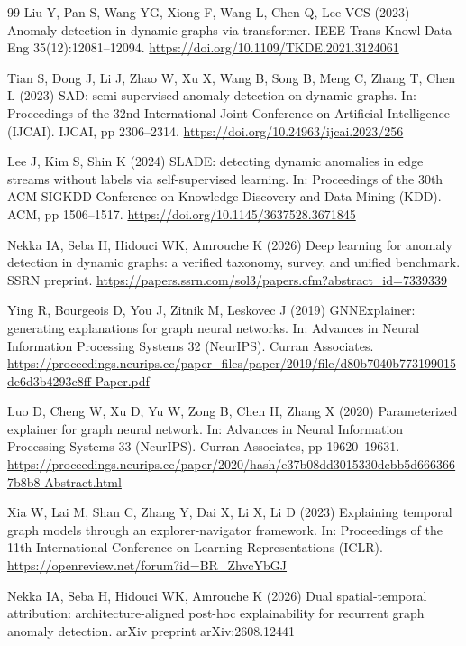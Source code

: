 \documentclass[pdflatex,sn-basic]{sn-jnl}
\theoremstyle{definition}
\theoremstyle{plain}
\begin{document}
\begin{thebibliography}{99}
Liu Y, Pan S, Wang YG, Xiong F, Wang L, Chen Q, Lee VCS (2023) Anomaly detection in dynamic graphs via transformer. IEEE Trans Knowl Data Eng 35(12):12081--12094. \url{https://doi.org/10.1109/TKDE.2021.3124061}

Tian S, Dong J, Li J, Zhao W, Xu X, Wang B, Song B, Meng C, Zhang T, Chen L (2023) SAD: semi-supervised anomaly detection on dynamic graphs. In: Proceedings of the 32nd International Joint Conference on Artificial Intelligence (IJCAI). IJCAI, pp 2306--2314. \url{https://doi.org/10.24963/ijcai.2023/256}

Lee J, Kim S, Shin K (2024) SLADE: detecting dynamic anomalies in edge streams without labels via self-supervised learning. In: Proceedings of the 30th ACM SIGKDD Conference on Knowledge Discovery and Data Mining (KDD). ACM, pp 1506--1517. \url{https://doi.org/10.1145/3637528.3671845}

Nekka IA, Seba H, Hidouci WK, Amrouche K (2026) Deep learning for anomaly detection in dynamic graphs: a verified taxonomy, survey, and unified benchmark. SSRN preprint. \url{https://papers.ssrn.com/sol3/papers.cfm?abstract_id=7339339}

Ying R, Bourgeois D, You J, Zitnik M, Leskovec J (2019) GNNExplainer: generating explanations for graph neural networks. In: Advances in Neural Information Processing Systems 32 (NeurIPS). Curran Associates. \url{https://proceedings.neurips.cc/paper_files/paper/2019/file/d80b7040b773199015de6d3b4293c8ff-Paper.pdf}

Luo D, Cheng W, Xu D, Yu W, Zong B, Chen H, Zhang X (2020) Parameterized explainer for graph neural network. In: Advances in Neural Information Processing Systems 33 (NeurIPS). Curran Associates, pp 19620--19631. \url{https://proceedings.neurips.cc/paper/2020/hash/e37b08dd3015330dcbb5d6663667b8b8-Abstract.html}

Xia W, Lai M, Shan C, Zhang Y, Dai X, Li X, Li D (2023) Explaining temporal graph models through an explorer-navigator framework. In: Proceedings of the 11th International Conference on Learning Representations (ICLR). \url{https://openreview.net/forum?id=BR_ZhvcYbGJ}

Nekka IA, Seba H, Hidouci WK, Amrouche K (2026) Dual spatial-temporal attribution: architecture-aligned post-hoc explainability for recurrent graph anomaly detection. arXiv preprint arXiv:2608.12441


\end{thebibliography}
\end{document}
